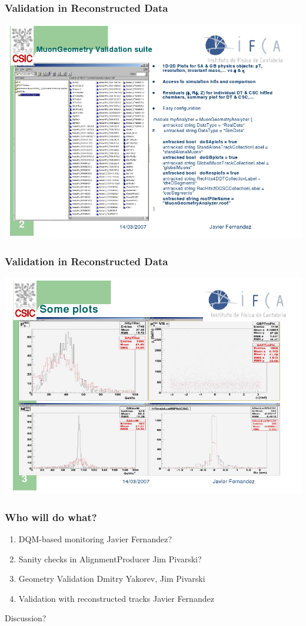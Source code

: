 \documentclass[compress]{beamer}
\begin{document}
\begin{frame}
\frametitle{Validation in Reconstructed Data}
\includegraphics[width=\linewidth]{javier1.png}
\end{frame}

\begin{frame}
\frametitle{Validation in Reconstructed Data}
\includegraphics[width=\linewidth]{javier2.png}
\end{frame}

\begin{frame}
\frametitle{Who will do what?}
\begin{enumerate}\setlength{\itemsep}{0.75 cm}
\item DQM-based monitoring \hfill \textcolor{dkblue}{Javier Fernandez?}
\item Sanity checks in AlignmentProducer \hfill \textcolor{dkblue}{Jim Pivarski?}
\item Geometry Validation \hfill \textcolor{dkblue}{Dmitry Yakorev, Jim Pivarski}
\item Validation with reconstructed tracks \hfill \textcolor{dkblue}{Javier Fernandez}
\end{enumerate}

\vfill Discussion?

\label{numpages}
\end{frame}
\end{document}
